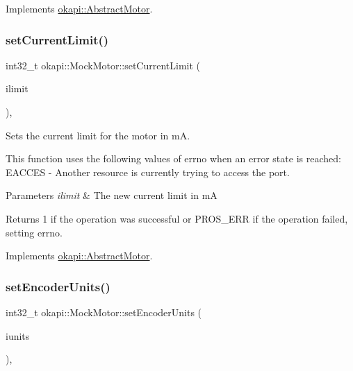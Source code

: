 Implements \mbox{\hyperlink{classokapi_1_1AbstractMotor_af7bb7d0d895c89d6b193f500587a818b}{okapi\+::\+Abstract\+Motor}}.

\mbox{\label{classokapi_1_1MockMotor_a91cac378cf47e923beb44a681af4d830}} 
\subsubsection{\texorpdfstring{setCurrentLimit()}{setCurrentLimit()}}
{\footnotesize\ttfamily int32\+\_\+t okapi\+::\+Mock\+Motor\+::set\+Current\+Limit (\begin{DoxyParamCaption}\item[{std\+::int32\+\_\+t}]{ilimit }\end{DoxyParamCaption})\hspace{0.3cm}{\ttfamily [override]}, {\ttfamily [virtual]}}



Sets the current limit for the motor in mA. 

This function uses the following values of errno when an error state is reached\+: E\+A\+C\+C\+ES -\/ Another resource is currently trying to access the port.


\begin{DoxyParams}{Parameters}
{\em ilimit} & The new current limit in mA \\
\hline
\end{DoxyParams}
\begin{DoxyReturn}{Returns}
1 if the operation was successful or P\+R\+O\+S\+\_\+\+E\+RR if the operation failed, setting errno. 
\end{DoxyReturn}


Implements \mbox{\hyperlink{classokapi_1_1AbstractMotor_aec97c81f3d6604363ebc8ceaf425fe39}{okapi\+::\+Abstract\+Motor}}.

\mbox{\label{classokapi_1_1MockMotor_a955c121e844f7d78eecfc865b71979c5}} 
\subsubsection{\texorpdfstring{setEncoderUnits()}{setEncoderUnits()}}
{\footnotesize\ttfamily int32\+\_\+t okapi\+::\+Mock\+Motor\+::set\+Encoder\+Units (\begin{DoxyParamCaption}\item[{\mbox{\hyperlink{classokapi_1_1AbstractMotor_ae811cd825099f2defadeb1b7f7e7764c}{encoder\+Units}}}]{iunits }\end{DoxyParamCaption})\hspace{0.3cm}{\ttfamily [override]}, {\ttfamily [virtual]}}



